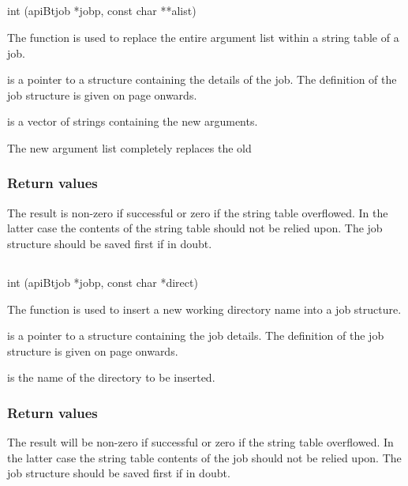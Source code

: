 \subsection{\funcnameXBputargglist{}}

\begin{expara}

int \funcnameXBputarglist{}(apiBtjob *jobp, const char **alist)

\end{expara}

The function \funcXBputarglist{} is used to replace
the entire argument list within a string table of a job.

 is a pointer to a structure containing the
details of the job. The definition of the job structure is given on
page \pageref{bkm:Jobstructure} onwards.

 is a vector of strings containing the new
arguments.

The new argument list completely replaces the old

\subsubsection{Return values}
The result is non-zero if successful or zero if the string table
overflowed. In the latter case the contents of the string table should
not be relied upon. The job structure should be saved first if in
doubt.

\subsection{\funcnameXBputdirect{}}

\begin{expara}

int \funcnameXBputdirect{}(apiBtjob *jobp, const char *direct)

\end{expara}

The function \funcXBputdirect{} is used to insert a
new working directory name into a job structure.

 is a pointer to a structure containing the
job details. The definition of the job structure is given on page
\pageref{bkm:Jobstructure} onwards.

 is the name of the directory to be
inserted.

\subsubsection{Return values}
The result will be non-zero if successful or zero if the string table
overflowed. In the latter case the string table contents of the job
should not be relied upon. The job structure should be saved first if
in doubt.

